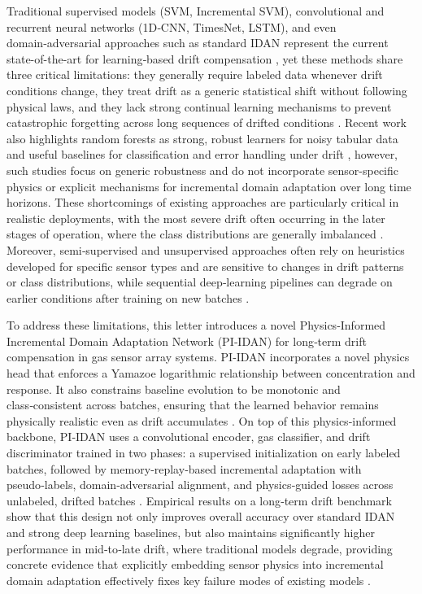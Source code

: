 \documentclass{IEEE_lsens}
\begin{document}
Traditional supervised models (SVM, Incremental SVM), convolutional and recurrent neural networks (1D‑CNN, TimesNet, LSTM), and even domain‑adversarial approaches such as standard IDAN represent the current state-of-the-art for learning‑based drift compensation \cite{dong2025real, zhao2019sensor}, yet these methods share three critical limitations: they generally require labeled data whenever drift conditions change, they treat drift as a generic statistical shift without following physical laws, and they lack strong continual learning mechanisms to prevent catastrophic forgetting across long sequences of drifted conditions \cite{dennler2022drift}. Recent work also highlights random forests as strong, robust learners for noisy tabular data and useful baselines for classification and error handling under drift \cite{salman2024random}, however, such studies focus on generic robustness and do not incorporate sensor-specific physics or explicit mechanisms for incremental domain adaptation over long time horizons. These shortcomings of existing approaches are particularly critical in realistic deployments, with the most severe drift often occurring in the later stages of operation, where the class distributions are generally imbalanced \cite{dennler2022drift}. Moreover, semi‑supervised and unsupervised approaches often rely on heuristics developed for specific sensor types and are sensitive to changes in drift patterns or class distributions, while sequential deep‑learning pipelines can degrade on earlier conditions after training on new batches \cite{vergara2012chemical, zhao2019sensor}.
 
 To address these limitations, this letter introduces a novel Physics‑Informed Incremental Domain Adaptation Network (PI‑IDAN) for long‑term drift compensation in gas sensor array systems. PI‑IDAN incorporates a novel physics head that enforces a Yamazoe logarithmic relationship between concentration and response. It also constrains baseline evolution to be monotonic and class‑consistent across batches, ensuring that the learned behavior remains physically realistic even as drift accumulates \cite{hua2018theoretical}. On top of this physics‑informed backbone, PI‑IDAN uses a convolutional encoder, gas classifier, and drift discriminator trained in two phases: a supervised initialization on early labeled batches, followed by memory‑replay‑based incremental adaptation with pseudo‑labels, domain‑adversarial alignment, and physics‑guided losses across unlabeled, drifted batches \cite{lee2024incremental, zhang2025lithium}. Empirical results on a long‑term drift benchmark show that this design not only improves overall accuracy over standard IDAN and strong deep learning baselines, but also maintains significantly higher performance in mid‑to‑late drift, where traditional %
 models degrade, providing concrete evidence that explicitly embedding sensor physics into incremental domain adaptation effectively fixes key failure modes of existing models \cite{dennler2022drift}.
\end{document}
